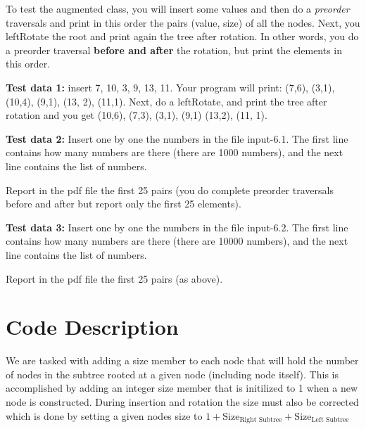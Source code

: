 \documentclass[11pt]{article}
\begin{document}
To test the augmented class, you will insert some values and then do a \emph{preorder} traversals and print in this order  the pairs (value, size) of all the nodes. 	Next, you \textsf{leftRotate} the root and print again the tree after rotation. In other words, you do a preorder traversal \textbf{before and after} the rotation, but print the elements in this order.

\textbf{Test data 1:} insert 7, 10, 3, 9, 13, 11. Your program will print: (7,6), (3,1), (10,4), (9,1), (13, 2), (11,1).
Next, do a \textsf{leftRotate}, and print the tree after rotation and you get (10,6), (7,3), (3,1), (9,1) (13,2), (11, 1).




\textbf{Test data 2:}  Insert one by one the numbers in the file input-6.1. The first line contains how many numbers are there (there are 1000 numbers), and the next line contains the list of numbers.

Report in the pdf file the first 25 pairs (you do complete preorder traversals before and after but report only the first 25 elements).

\textbf{Test data 3:} Insert one by one the numbers in the file input-6.2. The first line contains how many numbers are there (there are 10000 numbers), and the next line contains the list of numbers.

Report in the pdf file the first 25 pairs (as above).

\pagebreak
\section*{Code Description}
    We are tasked with adding a size member to each node that will hold the number of nodes in the subtree rooted at a given node (including node itself). This is accomplished by adding an integer size member that is initilized to 1 when a new node is constructed. During insertion and rotation the size must also be corrected which is done by setting a given nodes size to  $1 + \text{Size}_\text{Right Subtree} + \text{Size}_\text{Left Subtree}$

\begin{center}
\hspace{2cm}

\end{center}
\end{document}
